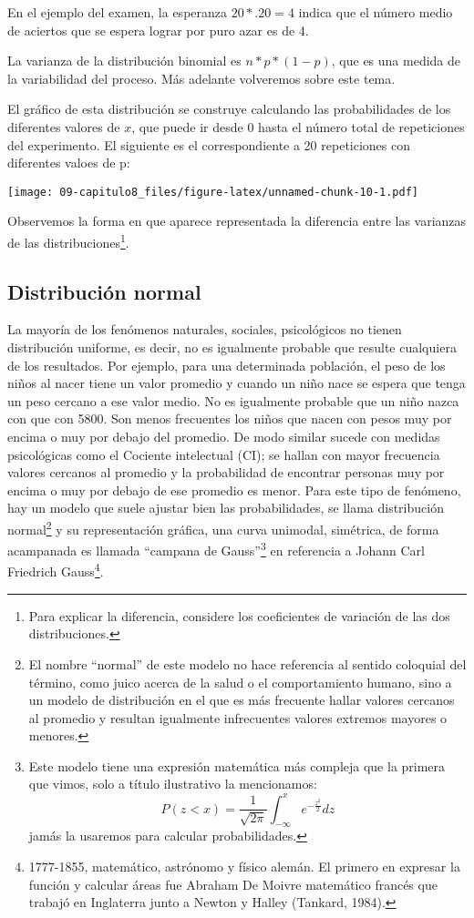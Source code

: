\documentclass[]{article}
\let\rmarkdownfootnote\footnote%
\def\footnote{\protect\rmarkdownfootnote}
\begin{document}
En el ejemplo del examen, la esperanza \(20*.20=4\) indica que el número
medio de aciertos que se espera lograr por puro azar es de 4.

La varianza de la distribución binomial es \(n*p*(1-p)\), que es una
medida de la variabilidad del proceso. Más adelante volveremos sobre
este tema.

El gráfico de esta distribución se construye calculando las
probabilidades de los diferentes valores de \(x\), que puede ir desde 0
hasta el número total de repeticiones del experimento. El siguiente es
el correspondiente a 20 repeticiones con diferentes valoes de p:

\texttt{[image: 09-capitulo8\_files/figure-latex/unnamed-chunk-10-1.pdf]}

Observemos la forma en que aparece representada la diferencia entre las
varianzas de las distribuciones\footnote{Para explicar la diferencia,
  considere los coeficientes de variación de las dos distribuciones.}.

\hypertarget{distribuciuxf3n-normal}{%
\subsection{Distribución normal}\label{distribuciuxf3n-normal}}

La mayoría de los fenómenos naturales, sociales, psicológicos no tienen
distribución uniforme, es decir, no es igualmente probable que resulte
cualquiera de los resultados. Por ejemplo, para una determinada
población, el peso de los niños al nacer tiene un valor promedio y
cuando un niño nace se espera que tenga un peso cercano a ese valor
medio. No es igualmente probable que un niño nazca con que con 5800. Son
menos frecuentes los niños que nacen con pesos muy por encima o muy por
debajo del promedio. De modo similar sucede con medidas psicológicas
como el Cociente intelectual (CI); se hallan con mayor frecuencia
valores cercanos al promedio y la probabilidad de encontrar personas muy
por encima o muy por debajo de ese promedio es menor. Para este tipo de
fenómeno, hay un modelo que suele ajustar bien las probabilidades, se
llama distribución normal\footnote{El nombre ``normal'' de este modelo
  no hace referencia al sentido coloquial del término, como juico acerca
  de la salud o el comportamiento humano, sino a un modelo de
  distribución en el que es más frecuente hallar valores cercanos al
  promedio y resultan igualmente infrecuentes valores extremos mayores o
  menores.} y su representación gráfica, una curva unimodal, simétrica,
de forma acampanada es llamada ``campana de Gauss''\footnote{Este modelo
  tiene una expresión matemática más compleja que la primera que vimos,
  solo a título ilustrativo la mencionamos:
  \[P(z < x) = \frac{1}{\sqrt{2\pi}}\int_{- \infty}^{x}e^{- \frac{z^{2}}{2}} dz\]
  jamás la usaremos para calcular probabilidades.} en referencia a
Johann Carl Friedrich Gauss\footnote{1777-1855, matemático, astrónomo y
  físico alemán. El primero en expresar la función y calcular áreas fue
  Abraham De Moivre matemático francés que trabajó en Inglaterra junto a
  Newton y Halley (Tankard, 1984).}.
\end{document}
